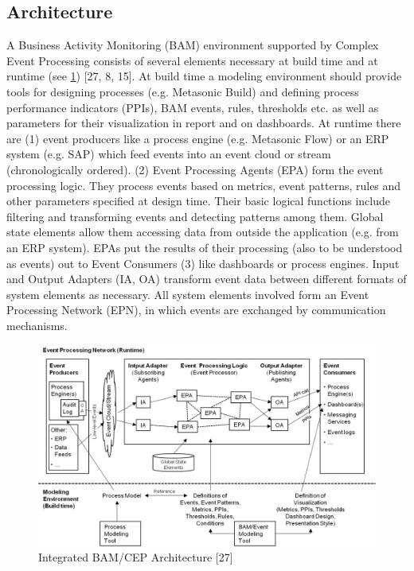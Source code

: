 \subsection{Architecture }  
A Business Activity Monitoring (BAM) environment supported by Complex Event Processing consists of several elements necessary at build time and at runtime (see \ref{fig:BAMArchitecture}) [27, 8, 15]. At build time a modeling environment should provide tools for designing processes (e.g. Metasonic Build) and defining process performance indicators (PPIs), BAM events, rules, thresholds etc. as well as parameters for their visualization in report and on dashboards. At runtime there are (1) event producers like a process engine (e.g. Metasonic Flow) or an ERP system (e.g. SAP) which feed events into an event cloud or stream (chronologically ordered). (2) Event Processing Agents (EPA) form the event processing logic. They process events based on metrics, event patterns, rules and other parameters specified at design time. Their basic logical functions include filtering and transforming events and detecting patterns among them. Global state elements allow them accessing data from outside the application (e.g. from an ERP system). EPAs put the results of their processing (also to be understood as events) out to Event Consumers (3) like dashboards or process engines. Input and Output Adapters (IA, OA) transform event data between different formats of system elements as necessary. All system elements involved form an Event Processing Network (EPN), in which events are exchanged by communication mechanisms.

\begin{figure}[h]
	\centering
	\includegraphics[width=0.9\linewidth]{Figures/Chapter5/Monitoring/Integrated-BAM-CEP-Architecture-27.jpg}
	\caption[Integrated BAM/CEP Architecture 27]{Integrated BAM/CEP Architecture [27]}
	\label{fig:BAMArchitecture}
\end{figure}



